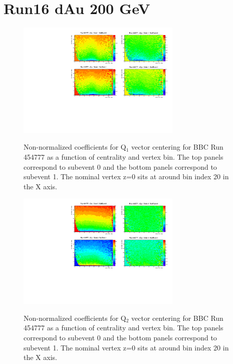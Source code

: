 \documentclass{article}
\begin{document}
\section{Run16 dAu 200 GeV}
\begin{figure}
\centering
\includegraphics[width=0.7\textwidth]{fig_eventplane/QC_454777_ORD0.pdf}
\label{fig.bbc.qc0}
\caption{Non-normalized coefficients for Q$_1$ vector centering for BBC Run 454777 as a function of centrality and vertex bin. The top panels correspond to subevent 0 and the bottom panels correspond to subevent 1. The nominal vertex z=0 sits at around bin index 20 in the X axis.}
\end{figure}
\begin{figure}
\centering
\includegraphics[width=0.7\textwidth]{fig_eventplane/QC_454777_ORD1.pdf}
\label{fig.bbc.qc1}
\caption{Non-normalized coefficients for Q$_2$ vector centering for BBC Run 454777 as a function of centrality and vertex bin. The top panels correspond to subevent 0 and the bottom panels correspond to subevent 1. The nominal vertex z=0 sits at around bin index 20 in the X axis.}
\end{figure}
\end{document}
